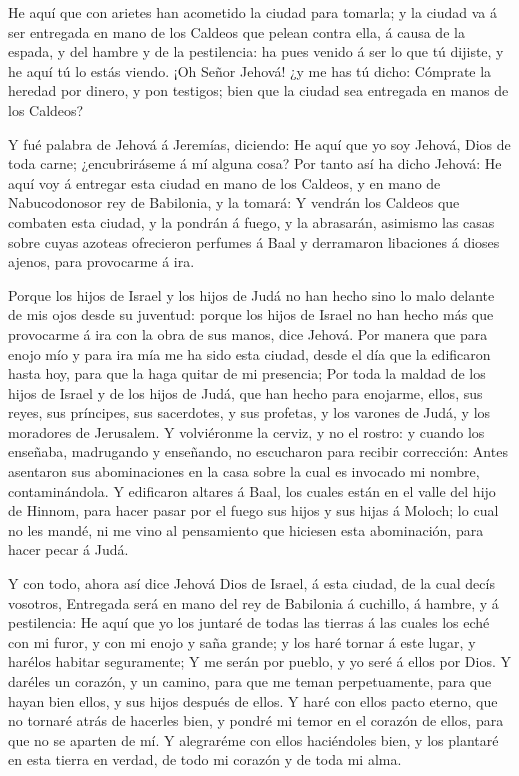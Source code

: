  He aquí que con arietes han acometido la ciudad para
tomarla; y la ciudad va á ser entregada en mano de los Caldeos que
pelean contra ella, á causa de la espada, y del hambre y de la
pestilencia: ha pues venido á ser lo que tú dijiste, y he aquí tú lo
estás viendo.  ¡Oh Señor Jehová! ¿y me has tú dicho:
Cómprate la heredad por dinero, y pon testigos; bien que la ciudad sea
entregada en manos de los Caldeos?

 Y fué palabra de Jehová á Jeremías, diciendo:
 He aquí que yo soy Jehová, Dios de toda carne;
¿encubriráseme á mí alguna cosa?  Por tanto así ha dicho
Jehová: He aquí voy á entregar esta ciudad en mano de los Caldeos, y en
mano de Nabucodonosor rey de Babilonia, y la tomará:  Y
vendrán los Caldeos que combaten esta ciudad, y la pondrán á fuego, y la
abrasarán, asimismo las casas sobre cuyas azoteas ofrecieron perfumes á
Baal y derramaron libaciones á dioses ajenos, para provocarme á ira.

 Porque los hijos de Israel y los hijos de Judá no han
hecho sino lo malo delante de mis ojos desde su juventud: porque los
hijos de Israel no han hecho más que provocarme á ira con la obra de sus
manos, dice Jehová.  Por manera que para enojo mío y para
ira mía me ha sido esta ciudad, desde el día que la edificaron hasta
hoy, para que la haga quitar de mi presencia;  Por toda la
maldad de los hijos de Israel y de los hijos de Judá, que han hecho para
enojarme, ellos, sus reyes, sus príncipes, sus sacerdotes, y sus
profetas, y los varones de Judá, y los moradores de Jerusalem.
 Y volviéronme la cerviz, y no el rostro: y cuando los
enseñaba, madrugando y enseñando, no escucharon para recibir corrección:
 Antes asentaron sus abominaciones en la casa sobre la cual
es invocado mi nombre, contaminándola.  Y edificaron
altares á Baal, los cuales están en el valle del hijo de Hinnom, para
hacer pasar por el fuego sus hijos y sus hijas á Moloch; lo cual no les
mandé, ni me vino al pensamiento que hiciesen esta abominación, para
hacer pecar á Judá.

 Y con todo, ahora así dice Jehová Dios de Israel, á esta
ciudad, de la cual decís vosotros, Entregada será en mano del rey de
Babilonia á cuchillo, á hambre, y á pestilencia:  He aquí
que yo los juntaré de todas las tierras á las cuales los eché con mi
furor, y con mi enojo y saña grande; y los haré tornar á este lugar, y
harélos habitar seguramente;  Y me serán por pueblo, y yo
seré á ellos por Dios.  Y daréles un corazón, y un camino,
para que me teman perpetuamente, para que hayan bien ellos, y sus hijos
después de ellos.  Y haré con ellos pacto eterno, que no
tornaré atrás de hacerles bien, y pondré mi temor en el corazón de
ellos, para que no se aparten de mí.  Y alegraréme con
ellos haciéndoles bien, y los plantaré en esta tierra en verdad, de todo
mi corazón y de toda mi alma.

